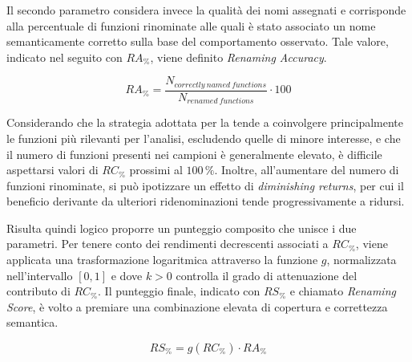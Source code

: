 Il secondo parametro considera invece la qualità dei nomi assegnati e corrisponde alla percentuale di funzioni rinominate alle quali è stato associato un nome semanticamente corretto sulla base del comportamento osservato. Tale valore, indicato nel seguito con ${RA}_{\%}$, viene definito \emph{Renaming Accuracy}.

\begin{equation*}
    {RA}_{\%} = \frac{N_{correctly\ named\ functions}}{N_{renamed\ functions}} \cdot 100
    \label{eq:renaming_accuracy}
\end{equation*}

Considerando che la strategia adottata per la \reversing{} tende a coinvolgere principalmente le funzioni più rilevanti per l'analisi, escludendo quelle di minore interesse, e che il numero di funzioni presenti nei campioni è generalmente elevato, è difficile aspettarsi valori di ${RC}_{\%}$ prossimi al $100\,\%$. Inoltre, all'aumentare del numero di funzioni rinominate, si può ipotizzare un effetto di \emph{diminishing returns}, per cui il beneficio derivante da ulteriori ridenominazioni tende progressivamente a ridursi.


Risulta quindi logico proporre un punteggio composito che unisce i due parametri. Per tenere conto dei rendimenti decrescenti associati a ${RC}_{\%}$, viene applicata una trasformazione logaritmica attraverso la funzione $g$, normalizzata nell'intervallo $[0,1]$ e dove $k>0$ controlla il grado di attenuazione del contributo di ${RC}_{\%}$. Il punteggio finale, indicato con ${RS}_{\%}$ e chiamato \emph{Renaming Score}, è volto a premiare una combinazione elevata di copertura e correttezza semantica.


\begin{equation*}
    {RS}_{\%} = g({RC}_{\%}) \cdot {RA}_{\%}
    \label{eq:renaming_score}
\end{equation*}

